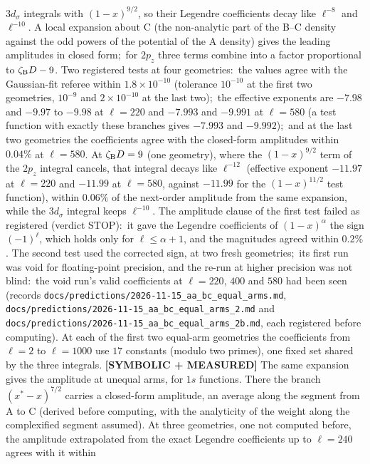 \documentclass[aps,pra,twocolumn,superscriptaddress,longbibliography]{revtex4-2}
\begin{document}
$3d_\sigma$ integrals with $(1-x)^{9/2}$, so their Legendre coefficients decay like $\ell^{-8}$ and
$\ell^{-10}$.  A local expansion about C (the non-analytic part of the B--C density against the odd
powers of the potential of the A density) gives the leading amplitudes in closed form;\ for
$2p_z$ three terms combine into a factor proportional to $\zeta_{\rm B}D-9$.  Two registered tests
at four geometries:\ the values agree with the Gaussian-fit referee within $1.8\times10^{-10}$ (tolerance
$10^{-10}$ at the first two geometries, $10^{-9}$ and $2\times10^{-10}$ at the last two);\ the effective exponents
are $-7.98$ and $-9.97$ to $-9.98$ at $\ell=220$ and $-7.993$ and $-9.991$ at $\ell=580$ (a test function with exactly
these branches gives $-7.993$ and $-9.992$);\ and at the last two geometries the coefficients agree
with the closed-form amplitudes within $0.04\%$ at $\ell=580$.  At $\zeta_{\rm B}D=9$ (one geometry), where the $(1-x)^{9/2}$ term of the
$2p_z$ integral cancels, that integral decays like $\ell^{-12}$ (effective exponent $-11.97$ at
$\ell=220$ and $-11.99$ at $\ell=580$, against $-11.99$ for the $(1-x)^{11/2}$ test function), within
$0.06\%$ of the next-order amplitude from the same expansion, while the $3d_\sigma$ integral keeps
$\ell^{-10}$.  The amplitude clause of the first test failed as registered (verdict STOP):\ it gave the Legendre
coefficients of $(1-x)^{\alpha}$ the sign $(-1)^\ell$, which holds only for $\ell\le\alpha+1$, and
the magnitudes agreed within $0.2\%$.  The second test used the corrected sign, at two fresh
geometries;\ its first run was void for floating-point precision, and the re-run at higher
precision was not blind:\ the void run's valid coefficients at $\ell=220$, $400$ and $580$ had been
seen (records
\texttt{docs/predictions/2026-11-15\_aa\_bc\_equal\_arms.md},
\texttt{docs/predictions/2026-11-15\_aa\_bc\_equal\_arms\_2.md} and
\texttt{docs/predictions/2026-11-15\_aa\_bc\_equal\_arms\_2b.md}, each registered before computing).
At each of the first two equal-arm geometries the coefficients from $\ell=2$ to $\ell=1000$ use $17$
constants (modulo two primes), one fixed set shared by the three integrals.
\textbf{[SYMBOLIC + MEASURED]} The same expansion gives the amplitude at unequal arms, for $1s$
functions.  There the branch $(x^{*}-x)^{7/2}$ carries a closed-form amplitude, an average along the
segment from A to C (derived before computing, with the analyticity of the weight along the
complexified segment assumed).  At three geometries, one not computed before, the amplitude
extrapolated from the exact Legendre coefficients up to $\ell=240$ agrees with it within
\end{document}
